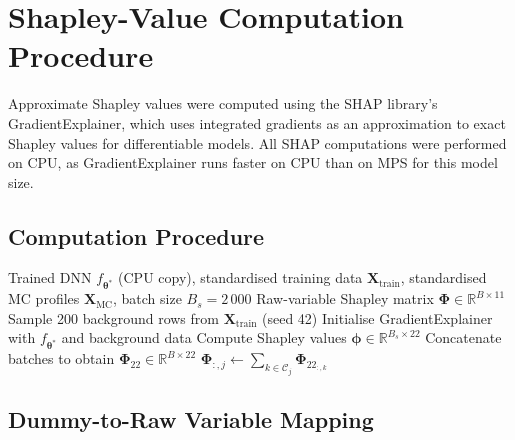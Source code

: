 \section{Shapley-Value Computation Procedure}
\label{annexure:shapley}

Approximate Shapley values were computed using the SHAP library's GradientExplainer, which uses integrated gradients as an approximation to exact Shapley values for differentiable models. All SHAP computations were performed on CPU, as GradientExplainer runs faster on CPU than on MPS for this model size.

\subsection{Computation Procedure}
\label{annexure:shap_setup}

\begin{algorithm}[htbp]
\caption{Batch Shapley-value computation with dummy-to-raw aggregation.}
\label{alg:shap_computation}
\begin{algorithmic}[1]
\Require Trained DNN $f_{\boldsymbol{\theta}^*}$ (CPU copy), standardised training data $\mathbf{X}_{\mathrm{train}}$, standardised MC profiles $\mathbf{X}_{\mathrm{MC}}$, batch size $B_s = 2\,000$
\Ensure Raw-variable Shapley matrix $\boldsymbol{\Phi} \in \mathbb{R}^{B \times 11}$
\State Sample 200 background rows from $\mathbf{X}_{\mathrm{train}}$ (seed 42)
\State Initialise GradientExplainer with $f_{\boldsymbol{\theta}^*}$ and background data
    \State Compute Shapley values $\boldsymbol{\phi} \in \mathbb{R}^{B_s \times 22}$
\EndFor
\State Concatenate batches to obtain $\boldsymbol{\Phi}_{22} \in \mathbb{R}^{B \times 22}$
    \State $\boldsymbol{\Phi}_{:,j} \gets \sum_{k \in \mathcal{C}_j} \boldsymbol{\Phi}_{22_{:,k}}$ 
\EndFor
\end{algorithmic}
\end{algorithm}

\subsection{Dummy-to-Raw Variable Mapping}
\label{annexure:shap_aggregation}

